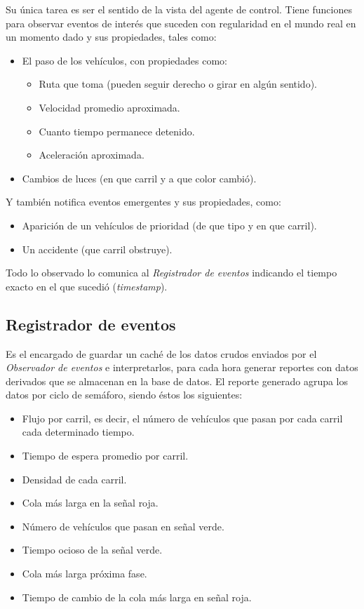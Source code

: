 Su única tarea es ser el sentido de la vista del agente de control.
Tiene funciones para observar eventos de interés que suceden con
regularidad en el mundo real en un momento dado y sus propiedades, tales
como:

\begin{itemize}
\tightlist
\item
  El paso de los vehículos, con propiedades como:

  \begin{itemize}
  \tightlist
  \item
    Ruta que toma (pueden seguir derecho o girar en algún sentido).
  \item
    Velocidad promedio aproximada.
  \item
    Cuanto tiempo permanece detenido.
  \item
    Aceleración aproximada.
  \end{itemize}
\item
  Cambios de luces (en que carril y a que color cambió).
\end{itemize}

Y también notifica eventos emergentes y sus propiedades, como:

\begin{itemize}
\tightlist
\item
  Aparición de un vehículos de prioridad (de que tipo y en que carril).
\item
  Un accidente (que carril obstruye).
\end{itemize}

Todo lo observado lo comunica al \emph{Registrador de eventos} indicando
el tiempo exacto en el que sucedió (\emph{timestamp}).

\hypertarget{registrador-de-eventos}{%
\subsection{Registrador de eventos}\label{registrador-de-eventos}}

Es el encargado de guardar un caché de los datos crudos enviados por el
\emph{Observador de eventos} e interpretarlos, para cada hora generar
reportes con datos derivados que se almacenan en la base de datos. El
reporte generado agrupa los datos por ciclo de semáforo, siendo éstos
los siguientes:

\begin{itemize}
\tightlist
\item
  Flujo por carril, es decir, el número de vehículos que pasan por cada
  carril cada determinado tiempo.
\item
  Tiempo de espera promedio por carril.
\item
  Densidad de cada carril.
\item
  Cola más larga en la señal roja.
\item
  Número de vehículos que pasan en señal verde.
\item
  Tiempo ocioso de la señal verde.
\item
  Cola más larga próxima fase.
\item
  Tiempo de cambio de la cola más larga en señal roja.
\end{itemize}

